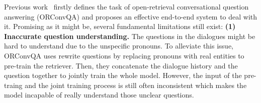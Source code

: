 Previous work~\cite{qu2020open} firstly defines the task of open-retrieval conversational question answering (ORConvQA) and proposes an effective end-to-end system to deal with it. 
Promising as it might be, several fundamental limitations still exist:
\textbf{(1) Inaccurate question understanding.} 
The questions in the dialogues might be hard to understand due to the unspecific pronouns. 
To alleviate this issue, ORConvQA uses rewrite questions by replacing pronouns with real entities to pre-train the retriever. Then, they concatenate the dialogue history and the question together to jointly train the whole model. However, the input of the pre-traing and the joint training process is still often inconsistent which makes the model incapable of really understand those unclear questions.
